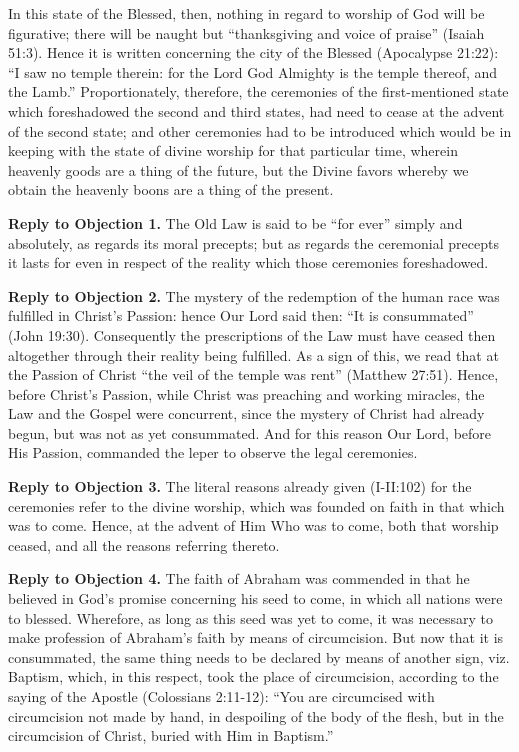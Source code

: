 In this state of the Blessed, then, nothing in regard to worship of God will be figurative; there will be naught but ``thanksgiving and voice of praise'' (Isaiah 51:3). Hence it is written concerning the city of the Blessed (Apocalypse 21:22): ``I saw no temple therein: for the Lord God Almighty is the temple thereof, and the Lamb.'' Proportionately, therefore, the ceremonies of the first-mentioned state which foreshadowed the second and third states, had need to cease at the advent of the second state; and other ceremonies had to be introduced which would be in keeping with the state of divine worship for that particular time, wherein heavenly goods are a thing of the future, but the Divine favors whereby we obtain the heavenly boons are a thing of the present.

\textbf{Reply to Objection 1.} The Old Law is said to be ``for ever'' simply and absolutely, as regards its moral precepts; but as regards the ceremonial precepts it lasts for even in respect of the reality which those ceremonies foreshadowed.

\textbf{Reply to Objection 2.} The mystery of the redemption of the human race was fulfilled in Christ's Passion: hence Our Lord said then: ``It is consummated'' (John 19:30). Consequently the prescriptions of the Law must have ceased then altogether through their reality being fulfilled. As a sign of this, we read that at the Passion of Christ ``the veil of the temple was rent'' (Matthew 27:51). Hence, before Christ's Passion, while Christ was preaching and working miracles, the Law and the Gospel were concurrent, since the mystery of Christ had already begun, but was not as yet consummated. And for this reason Our Lord, before His Passion, commanded the leper to observe the legal ceremonies.

\textbf{Reply to Objection 3.} The literal reasons already given (I-II:102) for the ceremonies refer to the divine worship, which was founded on faith in that which was to come. Hence, at the advent of Him Who was to come, both that worship ceased, and all the reasons referring thereto.

\textbf{Reply to Objection 4.} The faith of Abraham was commended in that he believed in God's promise concerning his seed to come, in which all nations were to blessed. Wherefore, as long as this seed was yet to come, it was necessary to make profession of Abraham's faith by means of circumcision. But now that it is consummated, the same thing needs to be declared by means of another sign, viz. Baptism, which, in this respect, took the place of circumcision, according to the saying of the Apostle (Colossians 2:11-12): ``You are circumcised with circumcision not made by hand, in despoiling of the body of the flesh, but in the circumcision of Christ, buried with Him in Baptism.''

